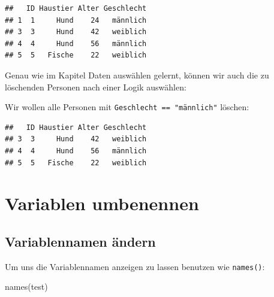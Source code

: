 \documentclass[
]{book}
\newenvironment{Shaded}{\begin{snugshade}}{\end{snugshade}}
\newcommand{\CommentTok}[1]{\textcolor[rgb]{0.56,0.35,0.01}{\textit{#1}}}
\newcommand{\FunctionTok}[1]{\textcolor[rgb]{0.00,0.00,0.00}{#1}}
\newcommand{\NormalTok}[1]{#1}
\newcommand{\OtherTok}[1]{\textcolor[rgb]{0.56,0.35,0.01}{#1}}
\newcommand{\SpecialCharTok}[1]{\textcolor[rgb]{0.00,0.00,0.00}{#1}}
\newcommand{\StringTok}[1]{\textcolor[rgb]{0.31,0.60,0.02}{#1}}
\begin{document}
\begin{verbatim}
##   ID Haustier Alter Geschlecht
## 1  1     Hund    24   männlich
## 3  3     Hund    42   weiblich
## 4  4     Hund    56   männlich
## 5  5   Fische    22   weiblich
\end{verbatim}

Genau wie im Kapitel Daten auswählen gelernt, können wir auch die zu löschenden Personen nach einer Logik auswählen:

Wir wollen alle Personen mit \texttt{Geschlecht\ ==\ "männlich"} löschen:

\begin{Shaded}
\end{Shaded}

\begin{verbatim}
##   ID Haustier Alter Geschlecht
## 3  3     Hund    42   weiblich
## 4  4     Hund    56   männlich
## 5  5   Fische    22   weiblich
\end{verbatim}

\hypertarget{variablen-umbenennen}{%
\section{Variablen umbenennen}\label{variablen-umbenennen}}

\hypertarget{variablennamen-uxe4ndern}{%
\subsection{Variablennamen ändern}\label{variablennamen-uxe4ndern}}

Um uns die Variablennamen anzeigen zu lassen benutzen wie \texttt{names()}:

\begin{Shaded}
\begin{Highlighting}[]
\FunctionTok{names}\NormalTok{(test)}
\end{Highlighting}
\end{Shaded}
\end{document}
